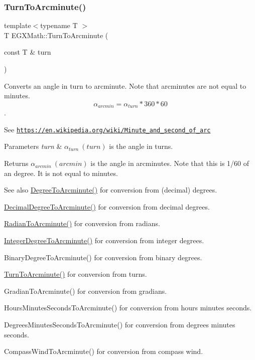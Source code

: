 \subsubsection{\texorpdfstring{Turn\+To\+Arcminute()}{TurnToArcminute()}}
{\footnotesize\ttfamily template$<$typename T $>$ \\
T E\+G\+X\+Math\+::\+Turn\+To\+Arcminute (\begin{DoxyParamCaption}\item[{const T \&}]{turn }\end{DoxyParamCaption})}



Converts an angle in turn to arcminute. Note that arcminutes are not equal to minutes. \[\alpha_{arcmin}=\alpha_{turn} * 360 * 60\]. 

See \href{https://en.wikipedia.org/wiki/Minute_and_second_of_arc}{\tt https\+://en.\+wikipedia.\+org/wiki/\+Minute\+\_\+and\+\_\+second\+\_\+of\+\_\+arc} 
\begin{DoxyParams}{Parameters}
{\em turn} & $\alpha_{turn}\ (turn)$ is the angle in turns. \\
\hline
\end{DoxyParams}
\begin{DoxyReturn}{Returns}
$\alpha_{arcmin}\ (arcmin)$ is the angle in arcminutes. Note that this is 1/60 of an degree. It is not equal to minutes. 
\end{DoxyReturn}
\begin{DoxySeeAlso}{See also}
\mbox{\hyperlink{group___e_g_x_math-_angle_conversions-_degree_ga8abf327dc5f52907b2c881999e9cc43e}{Degree\+To\+Arcminute()}} for conversion from (decimal) degrees. 

\mbox{\hyperlink{group___e_g_x_math-_angle_conversions-_decimal_degree_ga6b6ea6e45d2a13f556824ca419cc9fbd}{Decimal\+Degree\+To\+Arcminute()}} for conversion from decimal degrees. 

\mbox{\hyperlink{group___e_g_x_math-_angle_conversions-_radian_ga722e3b8e78540a6b3942b73b64aeb8d2}{Radian\+To\+Arcminute()}} for conversion from radians. 

\mbox{\hyperlink{group___e_g_x_math-_angle_conversions-_integer_degree_ga78b014e7649d666a3647c467e64e4fe8}{Integer\+Degree\+To\+Arcminute()}} for conversion from integer degrees. 

Binary\+Degree\+To\+Arcminute() for conversion from binary degrees. 

\mbox{\hyperlink{group___e_g_x_math-_angle_conversions-_turn_ga72cda928d9043c7d82097b1a7920769e}{Turn\+To\+Arcminute()}} for conversion from turns. 

Gradian\+To\+Arcminute() for conversion from gradians. 

Hours\+Minutes\+Seconds\+To\+Arcminute() for conversion from hours minutes seconds. 

Degrees\+Minutes\+Seconds\+To\+Arcminute() for conversion from degrees minutes seconds. 

Compass\+Wind\+To\+Arcminute() for conversion from compass wind. 
\end{DoxySeeAlso}
